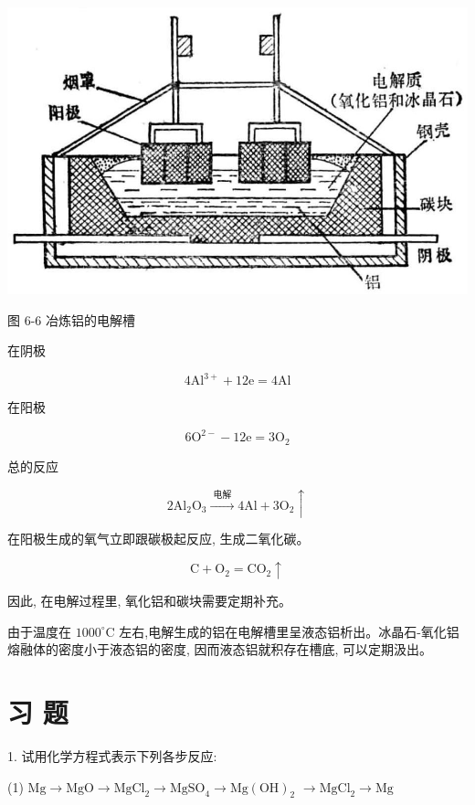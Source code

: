 \documentclass[10pt]{article}
\begin{document}
\begin{center}
\includegraphics[max width=1.0\textwidth]{images/01912d13-9986-7822-a012-3f3f7be99dcb_197_652189.jpg}
\end{center}

图 6-6 冶炼铝的电解槽

在阴极

\[
4{\mathrm{{Al}}}^{3 + } + {12}\mathrm{e} = 4\mathrm{{Al}}
\]

在阳极

\[
6{\mathrm{O}}^{2 - } - {12}\mathrm{e} = 3{\mathrm{O}}_{2}
\]

总的反应

\[
2{\mathrm{{Al}}}_{2}{\mathrm{O}}_{3}\xrightarrow[]{\text{ 电解 }}4\mathrm{{Al}} + 3{\mathrm{O}}_{2} \uparrow
\]

在阳极生成的氧气立即跟碳极起反应, 生成二氧化碳。

\[
\mathrm{C} + {\mathrm{O}}_{2} = {\mathrm{{CO}}}_{2} \uparrow
\]

因此, 在电解过程里, 氧化铝和碳块需要定期补充。

由于温度在 \({1000}^{ \circ }\mathrm{C}\) 左右,电解生成的铝在电解槽里呈液态铝析出。冰晶石-氧化铝熔融体的密度小于液态铝的密度, 因而液态铝就积存在槽底, 可以定期汲出。

\section*{习 题}

1. 试用化学方程式表示下列各步反应:

(1) \(\mathrm{{Mg}} \rightarrow \mathrm{{MgO}} \rightarrow {\mathrm{{MgCl}}}_{2} \rightarrow {\mathrm{{MgSO}}}_{4} \rightarrow \mathrm{{Mg}}{\left( \mathrm{{OH}}\right) }_{2}\) \(\rightarrow {\mathrm{{MgCl}}}_{2} \rightarrow \mathrm{{Mg}}\)
\end{document}
